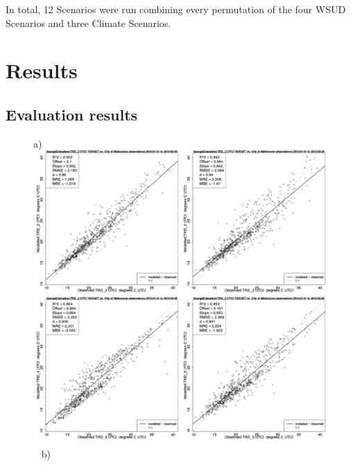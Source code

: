 \documentclass[final,3p,times,authoryear]{elsarticle}
\begin{document}
In total, 12 Scenarios were run combining every permutation of the four WSUD Scenarios and three Climate Scenarios.







\section{Results}

\subsection{Evaluation results}

\begin{figure}[!htbp]
a) \includegraphics[scale=0.15]{images/Eval/GeorgeEvaluation-ErrorPlots-UTCI.png}
~ b)

\end{figure}
\end{document}
